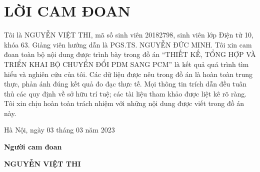 \section*{LỜI CAM ĐOAN}
\thispagestyle{empty}
Tôi là NGUYỄN VIỆT THI, mã số sinh viên 20182798, sinh viên lớp Điện tử 10, khóa 63. Giảng viên hướng dẫn là PGS.TS. NGUYỄN ĐỨC MINH. Tôi xin cam đoan toàn bộ nội dung được trình bày trong đồ án “THIẾT KẾ, TỔNG HỢP VÀ TRIỂN KHAI BỘ CHUYỂN ĐỔI PDM SANG PCM” là kết quả quá trình tìm hiểu và nghiên cứu của tôi. Các dữ liệu được nêu trong đồ án là hoàn toàn trung thực, phản ánh đúng kết quả đo đạc thực tế. Mọi thông tin trích dẫn đều tuân thủ các quy định về sở hữu trí tuệ; các tài liệu tham khảo được liệt kê rõ ràng. Tôi xin chịu hoàn toàn trách nhiệm với những nội dung được viết trong đồ án này.

\vspace{6pt}
\hspace{8.3cm}Hà Nội, ngày 03 tháng 03 năm 2023

\hspace{9.5cm}\textbf{Người cam đoan}

\vspace{2cm}
\hspace{9.15cm}\textbf{NGUYỄN VIỆT THI}
\newpage